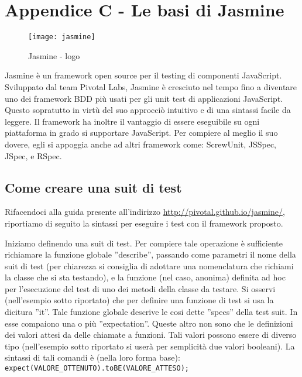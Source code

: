 \documentclass[10pt,a4paper,onecolumn]{article}
\begin{document}
\clearpage

\section{Appendice C - Le basi di Jasmine}

\begin{figure}[h]
	\centering
	\texttt{[image: jasmine]}
	\caption{Jasmine - logo}						
	\label{fig:jasmine logo}
\end{figure}

Jasmine è un framework open source per il testing di componenti JavaScript. Sviluppato dal team Pivotal Labs, Jasmine è cresciuto nel tempo fino a diventare uno dei framework BDD più usati per gli unit test di applicazioni JavaScript. Questo sopratutto in virtù del suo approcciò intuitivo e  di una sintassi facile da leggere. Il framework ha inoltre il vantaggio di essere eseguibile su ogni piattaforma in grado si supportare JavaScript. Per compiere al meglio il suo dovere, egli si appoggia anche ad altri framework come: ScrewUnit, JSSpec, JSpec, e RSpec.

\subsection{Come creare una suit di test}

Rifacendoci alla guida presente all'indirizzo \url{http://pivotal.github.io/jasmine/}, riportiamo di seguito la sintassi per eseguire i test con il framework proposto. 

Iniziamo definendo una suit di test. Per compiere tale operazione è sufficiente richiamare la funzione globale ''describe'', passando come parametri il nome della suit di test (per chiarezza si consiglia di adottare una nomenclatura che richiami la classe che si sta testando), e la funzione (nel caso, anonima) definita ad hoc per l'esecuzione del test di uno dei metodi della classe da testare. Si osservi (nell'esempio sotto riportato) che per definire una funzione di test si usa la dicitura ''it''. Tale funzione globale descrive le cosi dette ''specs'' della test suit. In esse compaiono una o più ''expectation''. Queste altro non sono che le definizioni dei valori attesi da delle chiamate a funzioni. Tali valori possono essere di diverso tipo (nell'esempio sotto riportato si userà per semplicità due valori booleani). La sintassi di tali comandi è (nella loro forma base): \\

\verb|expect(VALORE_OTTENUTO).toBE(VALORE_ATTESO);|\\
\end{document}
